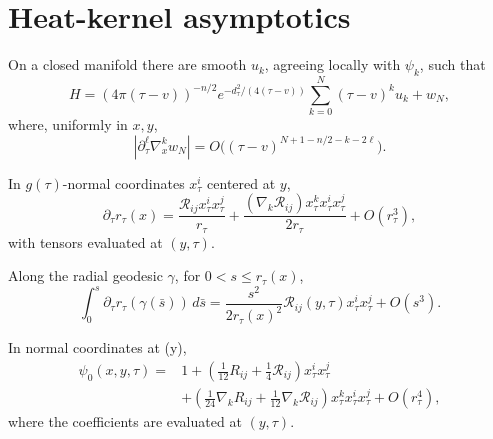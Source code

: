 \section{Heat-kernel asymptotics}

\begin{theorem}
\label{thm:chow-iii-evolving-heat-kernel-expansion}


On a closed manifold there are smooth \(u_k\), agreeing locally with
\(\psi_k\), such that
\[
 H=(4\pi(\tau-v))^{-n/2}e^{-d_\tau^2/(4(\tau-v))}
 \sum_{k=0}^N(\tau-v)^ku_k+w_N,
\]
where, uniformly in \(x,y\),
\[
 |\partial_\tau^\ell\nabla_x^kw_N|
 =O\bigl((\tau-v)^{N+1-n/2-k-2\ell}\bigr).
\]
\end{theorem}

\begin{lemma}
\label{lem:chow-iii-changing-distance-expansion}


In \(g(\tau)\)-normal coordinates \(x_\tau^i\) centered at \(y\),
\[
 \partial_\tau r_\tau(x)=\frac{\mathcal R_{ij}x_\tau^ix_\tau^j}{r_\tau}
 +\frac{(\nabla_k\mathcal R_{ij})x_\tau^kx_\tau^ix_\tau^j}{2r_\tau}
 +O(r_\tau^3),
\]
with tensors evaluated at \((y,\tau)\).
\end{lemma}

\begin{remark}
\label{rem:chow-iii-integrated-distance-expansion}


Along the radial geodesic \(\gamma\), for \(0<s\le r_\tau(x)\),
\[
 \int_0^s\partial_\tau r_\tau(\gamma(\bar s))\,d\bar s
 =\frac{s^2}{2r_\tau(x)^2}\mathcal R_{ij}(y,\tau)x_\tau^ix_\tau^j
 +O(s^3).
\]
\end{remark}

\begin{lemma}
\label{lem:chow-iii-psi-zero-expansion}


In normal coordinates at (y),
\[
 \begin{aligned}
 \psi_0(x,y,\tau)={}&1+
 \left(\frac1{12}R_{ij}+\frac14\mathcal R_{ij}\right)x_\tau^ix_\tau^j\\
 &+\left(\frac1{24}\nabla_kR_{ij}
          +\frac1{12}\nabla_k\mathcal R_{ij}\right)
 x_\tau^kx_\tau^ix_\tau^j+O(r_\tau^4),
 \end{aligned}
\]
where the coefficients are evaluated at \((y,\tau)\).
\end{lemma}

